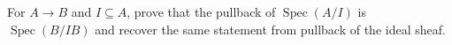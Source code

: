 \begin{problem}
For $A\to B$ and $I\subseteq A$, prove that the pullback of $\operatorname{Spec}(A/I)$ is $\operatorname{Spec}(B/IB)$ and recover the same statement from pullback of the ideal sheaf.
\end{problem}
